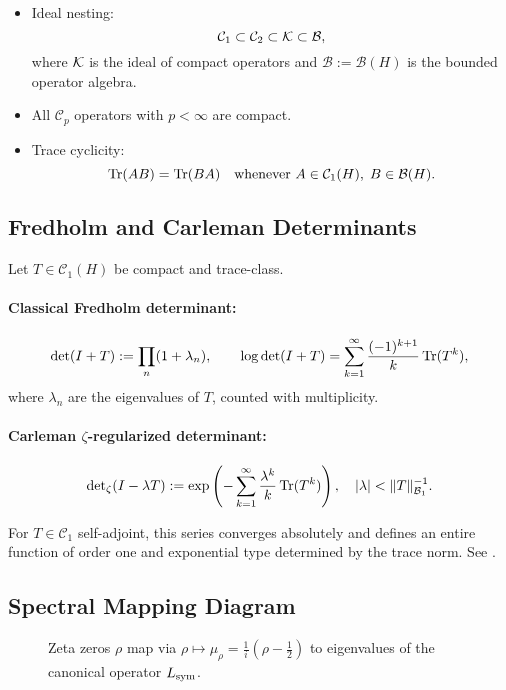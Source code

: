 \begin{itemize}
  \item Ideal nesting:
  \[
  \mathcal{C}_1 \subset \mathcal{C}_2 \subset \mathcal{K} \subset \mathcal{B},
  \]
  where \( \mathcal{K} \) is the ideal of compact operators and \( \mathcal{B} := \mathcal{B}(H) \) is the bounded operator algebra.

  \item All \( \mathcal{C}_p \) operators with \( p < \infty \) are compact.

  \item Trace cyclicity:
  \[
  \operatorname{Tr}(AB) = \operatorname{Tr}(BA) \quad \text{whenever } A \in \mathcal{C}_1(H),\; B \in \mathcal{B}(H).
  \]
\end{itemize}

\subsection*{Fredholm and Carleman Determinants}

Let \( T \in \mathcal{C}_1(H) \) be compact and trace-class.

\paragraph{Classical Fredholm determinant:}
\[
\det(I + T) := \prod_n (1 + \lambda_n), \qquad
\log \det(I + T) = \sum_{k=1}^\infty \frac{(-1)^{k+1}}{k} \operatorname{Tr}(T^k),
\]
where \( \lambda_n \) are the eigenvalues of \( T \), counted with multiplicity.

\paragraph{Carleman \(\zeta\)-regularized determinant:}
\[
\det\nolimits_\zeta(I - \lambda T) := \exp\left( -\sum_{k=1}^\infty \frac{\lambda^k}{k} \operatorname{Tr}(T^k) \right), \quad |\lambda| < \|T\|_{\mathcal{B}_1}^{-1}.
\]

For \( T \in \mathcal{C}_1 \) self-adjoint, this series converges absolutely and defines an entire function of order one and exponential type determined by the trace norm. See \cite[Ch.~4]{Simon2005TraceIdeals}.

\subsection*{Spectral Mapping Diagram}

\begin{figure}[ht]
\centering
\caption{Zeta zeros \( \rho \) map via \( \rho \mapsto \mu_\rho = \tfrac{1}{i}(\rho - \tfrac{1}{2}) \) to eigenvalues of the canonical operator \( L_{\mathrm{sym}} \).}
\label{fig:spectral-mapping}
\end{figure}

